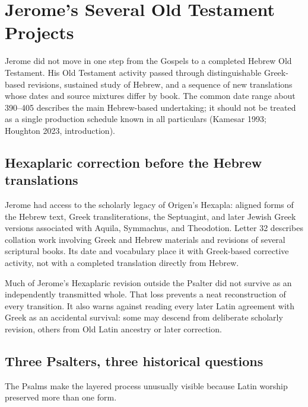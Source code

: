 \section{Jerome's Several Old Testament Projects}

Jerome did not move in one step from the Gospels to a completed Hebrew Old Testament. His Old Testament activity passed through distinguishable Greek-based revisions, sustained study of Hebrew, and a sequence of new translations whose dates and source mixtures differ by book. The common date range about 390--405 describes the main Hebrew-based undertaking; it should not be treated as a single production schedule known in all particulars (Kamesar 1993; Houghton 2023, introduction).

\subsection{Hexaplaric correction before the Hebrew translations}

Jerome had access to the scholarly legacy of Origen's Hexapla: aligned forms of the Hebrew text, Greek transliterations, the Septuagint, and later Jewish Greek versions associated with Aquila, Symmachus, and Theodotion. Letter 32 describes collation work involving Greek and Hebrew materials and revisions of several scriptural books. Its date and vocabulary place it with Greek-based corrective activity, not with a completed translation directly from Hebrew.

Much of Jerome's Hexaplaric revision outside the Psalter did not survive as an independently transmitted whole. That loss prevents a neat reconstruction of every transition. It also warns against reading every later Latin agreement with Greek as an accidental survival: some may descend from deliberate scholarly revision, others from Old Latin ancestry or later correction.

\subsection{Three Psalters, three historical questions}

The Psalms make the layered process unusually visible because Latin worship preserved more than one form.

